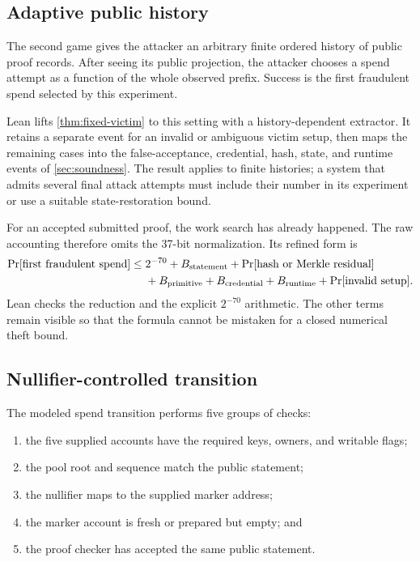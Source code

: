 \subsection{Adaptive public history}

The second game gives the attacker an arbitrary finite ordered history of
public proof records.  After seeing its public projection, the attacker
chooses a spend attempt as a function of the whole observed prefix.  Success
is the first fraudulent spend selected by this experiment.

Lean lifts \cref{thm:fixed-victim} to this setting with a history-dependent
extractor.  It retains a separate event for an invalid or ambiguous victim
setup, then maps the remaining cases into the false-acceptance, credential,
hash, state, and runtime events of \cref{sec:soundness}.  The result applies to
finite histories; a system that admits several final attack attempts must
include their number in its experiment or use a suitable state-restoration
bound.

For an accepted submitted proof, the work search has already happened.  The
raw accounting therefore omits the 37-bit normalization.  Its refined form is
\begin{align}
  \Pr[\text{first fraudulent spend}] \leq {}& 2^{-70}
    +B_{\mathrm{statement}}+\Pr[\text{hash or Merkle residual}] \notag\\
    &+B_{\mathrm{primitive}}+B_{\mathrm{credential}}
    +B_{\mathrm{runtime}}+\Pr[\text{invalid setup}].
  \label{eq:raw-theft-70}
\end{align}
Lean checks the reduction and the explicit \(2^{-70}\) arithmetic.  The other
terms remain visible so that the formula cannot be mistaken for a closed
numerical theft bound.

\subsection{Nullifier-controlled transition}

The modeled spend transition performs five groups of checks:

\begin{enumerate}[leftmargin=*]
  \item the five supplied accounts have the required keys, owners, and
        writable flags;
  \item the pool root and sequence match the public statement;
  \item the nullifier maps to the supplied marker address;
  \item the marker account is fresh or prepared but empty; and
  \item the proof checker has accepted the same public statement.
\end{enumerate}

